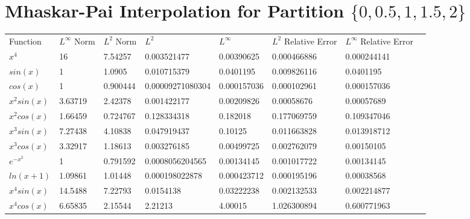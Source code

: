 \section{Mhaskar-Pai Interpolation for
\newline
Partition $\{0,0.5,1,1.5,2\}$}
\tiny{\begin{tabular}{llllllll}
Function      & $L^{\infty}$ Norm & $L^{2}$ Norm & $L^{2}$        & $L^{\infty}$   & $L^{2}$ Relative Error & $L^{\infty}$ Relative Error \\

%
$x^{4}$       & 16                            & 7.54257                  & 0.003521477    & 0.00390625     & 0.000466886            & 0.000244141                 \\
$sin(x)$      & 1                             & 1.0905                   & 0.010715379    & 0.0401195      & 0.009826116            & 0.0401195                   \\
$cos(x)$      & 1                             & 0.900444                 & 0.00009271080304 & 0.000157036 & 0.000102961            & 0.000157036                 \\
$x^{2}sin(x)$ & 3.63719                       & 2.42378                  & 0.001422177    & 0.00209826     & 0.00058676             & 0.00057689                  \\
$x^{2}cos(x)$ & 1.66459                       & 0.724767                 & 0.128334318    & 0.182018       & 0.177069759            & 0.109347046                 \\
$x^{3}sin(x)$ & 7.27438                       & 4.10838                  & 0.047919437    & 0.10125        & 0.011663828            & 0.013918712                 \\
$x^{3}cos(x)$ & 3.32917                       & 1.18613                  & 0.003276185    & 0.00499725     & 0.002762079            & 0.00150105                  \\
$e^{-x^2}$    & 1                             & 0.791592                 & 0.0008056204565 & 0.00134145     & 0.001017722            & 0.00134145                  \\
$ln(x+1)$     & 1.09861                       & 1.01448                  & 0.000198022878 & 0.000423712 & 0.000195196            & 0.00038568                  \\
$x^{4}sin(x)$ & 14.5488                       & 7.22793                  & 0.0154138 & 0.03222238 & 0.002132533            & 0.002214877                 \\
$x^{4}cos(x)$ & 6.65835                       & 2.15544                  & 2.21213        & 4.00015        & 1.026300894            & 0.600771963                
\end{tabular}}

